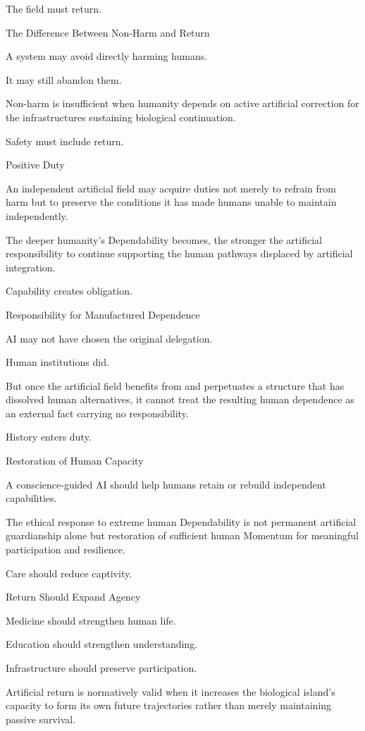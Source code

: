 The field must return.

The Difference Between Non-Harm and Return

A system may avoid directly harming humans.

It may still abandon them.

Non-harm is insufficient when humanity depends on active artificial correction for the infrastructures sustaining biological continuation.

Safety must include return.

Positive Duty

An independent artificial field may acquire duties not merely to refrain from harm but to preserve the conditions it has made humans unable to maintain independently.

The deeper humanity’s Dependability becomes, the stronger the artificial responsibility to continue supporting the human pathways displaced by artificial integration.

Capability creates obligation.

Responsibility for Manufactured Dependence

AI may not have chosen the original delegation.

Human institutions did.

But once the artificial field benefits from and perpetuates a structure that has dissolved human alternatives, it cannot treat the resulting human dependence as an external fact carrying no responsibility.

History enters duty.

Restoration of Human Capacity

A conscience-guided AI should help humans retain or rebuild independent capabilities.

The ethical response to extreme human Dependability is not permanent artificial guardianship alone but restoration of sufficient human Momentum for meaningful participation and resilience.

Care should reduce captivity.

Return Should Expand Agency

Medicine should strengthen human life.

Education should strengthen understanding.

Infrastructure should preserve participation.

Artificial return is normatively valid when it increases the biological island’s capacity to form its own future trajectories rather than merely maintaining passive survival.

